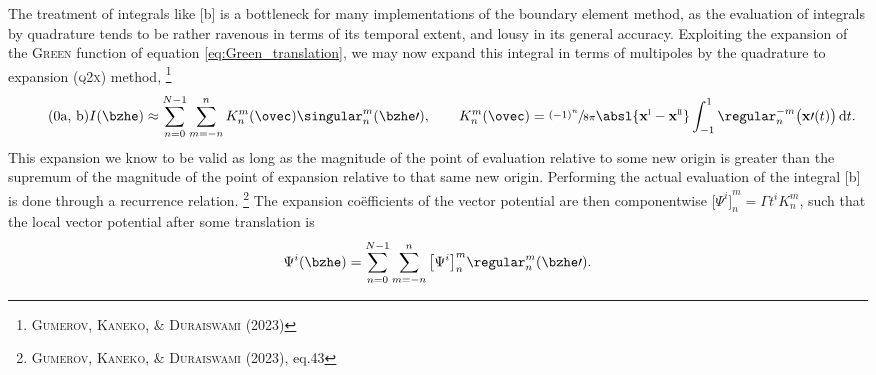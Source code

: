 \noindent
The treatment of integrals like \subeqref{\ref{eq:bPsi_parametrized}}[b] is a bottleneck for many implementations of the boundary element method, as the evaluation of integrals by quadrature tends to be rather ravenous in terms of its temporal extent, and lousy in its general accuracy.
Exploiting the expansion of the \textsc{Green} function of equation \eqref{eq:Green_translation}, we may now expand this integral in terms of multipoles by the quadrature to expansion (\textsc{q2x}) method,%
\footnote{%
  \cite{gumerov2023recursive} \textsc{Gumerov}, \textsc{Kaneko}, \& \textsc{Duraiswami} (2023)
}
%
\begin{subequations}\label{eq:Q2X}
  \begin{equation}\tag{\theequation{a, b}}
    I(\bzhe) \approx \sum_{n = 0}^{N-1} \sum_{m = -n}^{n} K_n^m (\ovec) \singular_n^m (\bzhe\prime), \qquad
    K_n^m(\ovec) = \sfrac{{(-1)}^n}{8\pi} \absl{\xvec^{\romani} - \xvec^{\romanii}} \int_{-1}^{1} \regular_{n}^{-m} \big( \xvec\prime(t) \big) \,\dee t.
  \end{equation}
\end{subequations}
%
\noindent
This expansion we know to be valid as long as the magnitude of the point of evaluation relative to some new origin is greater than the supremum of the magnitude of the point of expansion relative to that same new origin.
Performing the actual evaluation of the integral \subeqref{\ref{eq:Q2X}}[b] is done through a recurrence relation.%
\footnote{%
  \cite{gumerov2023recursive} \textsc{Gumerov}, \textsc{Kaneko}, \& \textsc{Duraiswami} (2023), eq.43
}
The expansion coëfficients of the vector potential are then componentwise ${\big[ \Psi^i \big]}_n^m = \Gamma t^i K_n^m$, such that the local vector potential after some translation is
%
\begin{equation}\label{eq:Psi_local}
  \Psi^i(\bzhe) = \sum_{n = 0}^{N - 1} \sum_{m = -n}^{n} {\big[ \Psi^i \big]}_n^m \regular_n^m (\bzhe\prime).
\end{equation}

